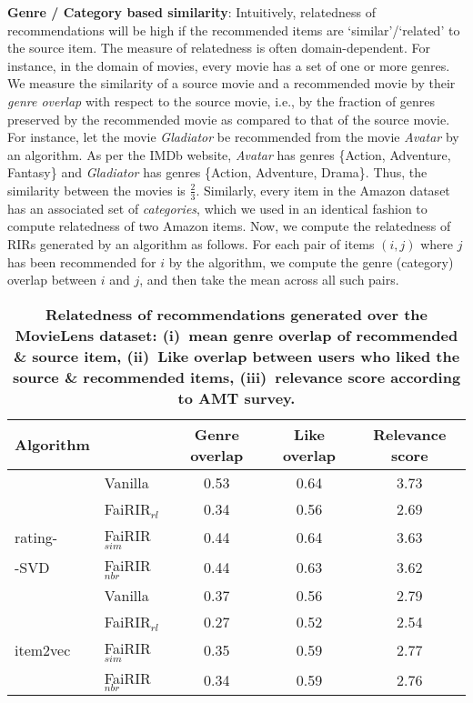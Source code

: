 \noindent \textbf{Genre / Category based similarity}: Intuitively, relatedness of recommendations will be high if the recommended items are `similar'/`related' to the source item. The measure of relatedness is often domain-dependent. For instance, in the domain of movies, every movie has a set of one or more genres.
We measure the similarity of a source movie and a recommended movie by their {\it genre overlap} with respect to the source movie, i.e., by the fraction of genres preserved by the recommended movie as compared to that of the source movie.
For instance, let the movie {\it Gladiator} be recommended from the movie {\it Avatar} by an algorithm. As per the IMDb website, {\it Avatar} has genres \{Action, Adventure, Fantasy\} and {\it Gladiator} has genres \{Action, Adventure, Drama\}. Thus, the similarity between the movies is $\frac{2}{3}$.
Similarly, every item in the Amazon dataset has an associated set of {\it categories}, which we used in an identical fashion to compute relatedness of two Amazon items.
Now, we compute the relatedness of RIRs generated by an algorithm as follows. 
For each pair of items $(i,j)$ where $j$ has been recommended for $i$ by the algorithm, we compute the genre (category) overlap between $i$ and $j$, and then take the mean across all such pairs.

\begin{table}[tb]
	\noindent
	\scriptsize
	\centering
	\begin{tabular}{|p{1cm}|p{1cm}|c|c|c|}
		\hline
		Algorithm &  & Genre overlap & Like overlap & Relevance score \\
		\hline
		& Vanilla 		& 0.53 & 0.64 & 3.73\\ \cline{2-5}
		& FaiRIR$_{rl}$	& 0.34 & 0.56 & 2.69\\ \cline{2-5}
		rating-	  & FaiRIR$_{sim}$	& 0.44 & 0.64 & 3.63\\ \cline{2-5}
		-SVD& FaiRIR$_{nbr}$	& 0.44 & 0.63 & 3.62\\
		\hline \hline
		& Vanilla 		& 0.37 & 0.56 & 2.79\\ \cline{2-5}
		& FaiRIR$_{rl}$	& 0.27 & 0.52 & 2.54\\ \cline{2-5}
		item2vec & FaiRIR$_{sim}$	& 0.35 & 0.59 & 2.77 \\ \cline{2-5}
		& FaiRIR$_{nbr}$	& 0.34 & 0.59 & 2.76\\
		\hline
		
	\end{tabular}	
	\caption{{\bf Relatedness of recommendations generated %
			over the MovieLens dataset: (i)~mean genre overlap of recommended \& source item, (ii)~Like overlap between users who liked the source \& recommended items, (iii)~relevance score according to AMT survey.}}
	\label{Tab:relatedness-of-recs}
	\vspace{-4 mm}
\end{table}

